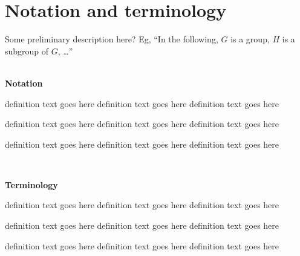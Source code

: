 

\chapter{Notation and terminology}\label{notation}

\renewcommand{\thefootnote}{\fnsymbol{footnote}}



Some preliminary description here?  Eg, ``In the following, $G$ is
a group, $H$ is a subgroup of $G$, \ldots''
\\


\

\noindent\textbf{Notation}


\newcommand{\nttn}[2]{\item[{\ \makebox[3.18cm][l]{#1}}]{#2}}
\begin{list}{}{ \setlength{\leftmargin}{3.4cm}
                \setlength{\labelwidth}{3.4cm}}

\nttn{notation}{definition text goes here definition text goes
                here definition text goes here}

\nttn{notation}{definition text goes here definition text goes
                here definition text goes here}

\nttn{notation}{definition text goes here definition text goes
                here definition text goes here}

\end{list}

\

\noindent\textbf{Terminology}


\newcommand{\term}[2]{\item[{\ \makebox[4.58cm][l]{#1}}]{#2}}
\begin{list}{}{ \setlength{\leftmargin}{4.8cm}
                \setlength{\labelwidth}{4.8cm}}

\term{terminology}{definition text goes here definition text goes
                   here definition text goes here}

\term{terminology}{definition text goes here definition text goes
                   here definition text goes here}

\term{terminology}{definition text goes here definition text goes
                   here definition text goes here}

\end{list}
